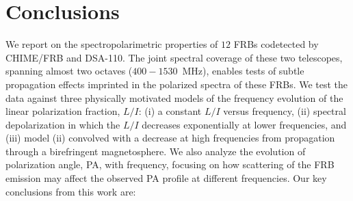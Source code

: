 \documentclass[twocolumn, linenumbers]{aastex701}
\begin{document}
\section{Conclusions} \label{sec:conclusions}
We report on the spectropolarimetric properties of $12$ FRBs codetected by CHIME/FRB and DSA-110. The joint spectral coverage of these two telescopes, spanning almost two octaves ($400-1530$~MHz), enables tests of subtle propagation effects imprinted in the polarized spectra of these FRBs. We test the data against three physically motivated models of the frequency evolution of the linear polarization fraction, $L/I$: (i) a constant $L/I$ versus frequency, (ii) spectral depolarization in which the $L/I$ decreases exponentially at lower frequencies, and (iii) model (ii) convolved with a decrease at high frequencies from propagation through a birefringent magnetosphere. We also analyze the evolution of polarization angle, PA, with frequency, focusing on how scattering of the FRB emission may affect the observed PA profile at different frequencies. Our key conclusions from this work are:
\end{document}
